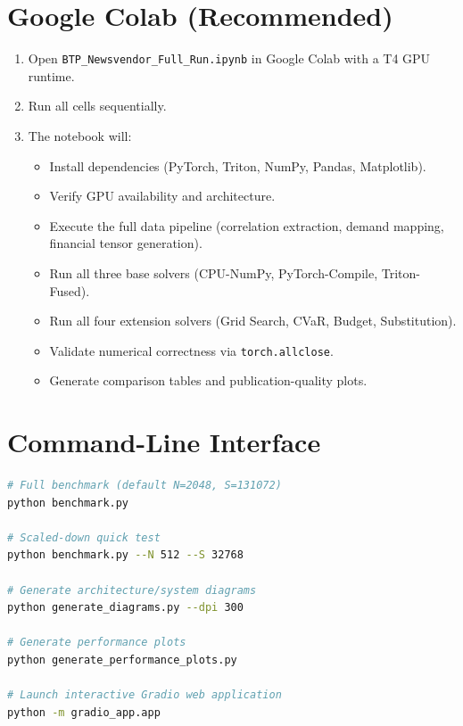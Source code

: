 
\section*{Google Colab (Recommended)}

\begin{enumerate}
    \item Open \texttt{BTP\_Newsvendor\_Full\_Run.ipynb} in Google Colab with a T4 GPU runtime.
    \item Run all cells sequentially.
    \item The notebook will:
    \begin{itemize}[nosep]
        \item Install dependencies (PyTorch, Triton, NumPy, Pandas, Matplotlib).
        \item Verify GPU availability and architecture.
        \item Execute the full data pipeline (correlation extraction, demand mapping, financial tensor generation).
        \item Run all three base solvers (CPU-NumPy, PyTorch-Compile, Triton-Fused).
        \item Run all four extension solvers (Grid Search, CVaR, Budget, Substitution).
        \item Validate numerical correctness via \texttt{torch.allclose}.
        \item Generate comparison tables and publication-quality plots.
    \end{itemize}
\end{enumerate}

\section*{Command-Line Interface}

\begin{lstlisting}[language=bash, frame=single, numbers=none, xleftmargin=0em]
# Full benchmark (default N=2048, S=131072)
python benchmark.py

# Scaled-down quick test
python benchmark.py --N 512 --S 32768

# Generate architecture/system diagrams
python generate_diagrams.py --dpi 300

# Generate performance plots
python generate_performance_plots.py

# Launch interactive Gradio web application
python -m gradio_app.app
\end{lstlisting}

